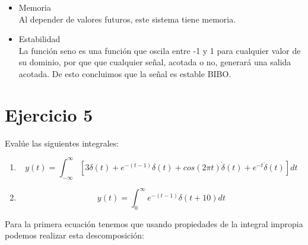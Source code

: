 \documentclass[10pt,a4paper]{report}
\begin{document}
\begin{enumerate}
\begin{itemize}
  \item Memoria\\
Al depender de valores futuros, este sistema tiene memoria.\\

  \item Estabilidad\\
La función seno es una función que oscila entre -1 y 1 para cualquier valor de su dominio, por que que cualquier señal, acotada o no, generará una salida acotada. De esto concluimos que la señal es estable BIBO.
  \end{itemize}
\end{enumerate}

\section{Ejercicio 5}

Evalúe las siguientes integrales:
\begin{enumerate}
  \item \[ y(t)=\int_{-\infty }^{\infty }[3\delta (t)+e^{-(t-1)}\delta (t)+cos(2\pi t)\dot{\delta}(t)+e^{-t}\ddot{\delta}(t)]dt \]

  \item \[ y(t)=\int_{0}^{\infty }e^{-(t-1)}\delta (t+10)dt \]

\end{enumerate}

Para la primera ecuación tenemos que usando propiedades de la integral impropia podemos realizar esta descomposición:
\end{document}
